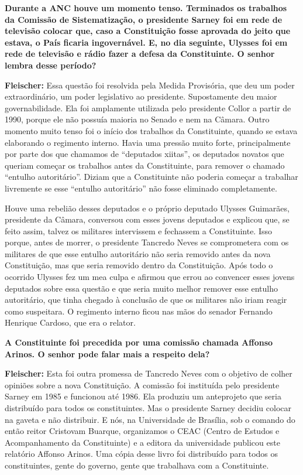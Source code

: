 \textbf{Durante a ANC houve um momento tenso. Terminados os trabalhos da
Comissão de Sistematização, o presidente Sarney foi em rede de televisão
colocar que, caso a Constituição fosse aprovada do jeito que estava, o
País ficaria ingovernável. E, no dia seguinte, Ulysses foi em rede de
televisão e rádio fazer a defesa da Constituinte. O senhor lembra desse
período?}

\textbf{Fleischer:} Essa questão foi resolvida pela Medida Provisória,
que deu um poder extraordinário, um poder legislativo ao presidente.
Supostamente deu maior governabilidade. Ela foi amplamente utilizada
pelo presidente Collor a partir de 1990, porque ele não possuía maioria
no Senado e nem na Câmara. Outro momento muito tenso foi o início dos
trabalhos da Constituinte, quando se estava elaborando o regimento
interno. Havia uma pressão muito forte, principalmente por parte dos que
chamamos de ``deputados xiitas'', os deputados novatos que queriam
começar os trabalhos antes da Constituinte, para remover o chamado
``entulho autoritário''. Diziam que a Constituinte não poderia começar a
trabalhar livremente se esse ``entulho autoritário'' não fosse eliminado
completamente.

Houve uma rebelião desses deputados e o próprio deputado Ulysses
Guimarães, presidente da Câmara, conversou com esses jovens deputados e
explicou que, se feito assim, talvez os militares intervissem e
fechassem a Constituinte. Isso porque, antes de morrer, o presidente
Tancredo Neves se comprometera com os militares de que esse entulho
autoritário não seria removido antes da nova Constituição, mas que seria
removido dentro da Constituição. Após todo o ocorrido Ulysses fez um mea
culpa e afirmou que errou ao convencer esses jovens deputados sobre essa
questão e que seria muito melhor remover esse entulho autoritário, que
tinha chegado à conclusão de que os militares não iriam reagir como
suspeitara. O regimento interno ficou nas mãos do senador Fernando
Henrique Cardoso, que era o relator.

\textbf{A Constituinte foi precedida por uma comissão chamada Affonso
Arinos. O senhor pode falar mais a respeito dela?}

\textbf{Fleischer:} Esta foi outra promessa de Tancredo Neves com o
objetivo de colher opiniões sobre a nova Constituição. A comissão foi
instituída pelo presidente Sarney em 1985 e funcionou até 1986. Ela
produziu um anteprojeto que seria distribuído para todos os
constituintes. Mas o presidente Sarney decidiu colocar na gaveta e não
distribuir. E nós, na Universidade de Brasília, sob o comando do então
reitor Cristovam Buarque, organizamos o CEAC (Centro de Estudos e
Acompanhamento da Constituinte) e a editora da universidade publicou
este relatório Affonso Arinos. Uma cópia desse livro foi distribuído
para todos os constituintes, gente do governo, gente que trabalhava com
a Constituinte.

